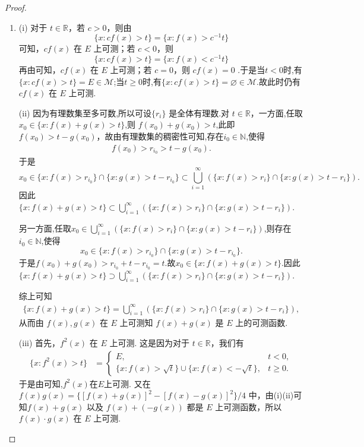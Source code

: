 \documentclass[../../main.tex]{subfiles}%
\begin{document}
\begin{proof}
\begin{enumerate}[(1)]
\item (i) 对于 \(t \in \mathbb{R}\)，若 \(c > 0\)，则由
\[
\{x: cf(x) > t\} = \{x: f(x) > c^{-1}t\}
\]
可知，\(cf(x)\) 在 \(E\) 上可测；若 \(c < 0\)，则
\[
\{x: cf(x) > t\} = \{x: f(x) < c^{-1}t\}
\]
再由可知，\(cf(x)\) 在 \(E\) 上可测；若 \(c = 0\)，则 \(cf(x) = 0\) .于是当$t<0$时,有
$\{x:cf(x)>t\}=E\in \mathscr{M}$;当$t\geqslant 0$时,有$\{x:cf(x)>t\}=\varnothing\in \mathscr{M}$.故此时仍有\(cf(x)\) 在 \(E\) 上可测.

(ii) 因为有理数集至多可数,所以可设\(\{r_i\}\) 是全体有理数.对 \(t \in \mathbb{R}\)，一方面,任取$x_0\in \{x: f(x) + g(x) > t\}$,则 \(f(x_0) + g(x_0) > t\),此即 \(f(x_0) > t - g(x_0)\)，故由有理数集的稠密性可知,存在$i_0\in\mathbb{N}$,使得
\begin{align*}
f(x_0)>r_{i_0}>t-g(x_0).
\end{align*}
于是$$x_0\in \{x:f(x)>r_{i_0}\}\cap \{x: g(x) > t - r_{i_0}\}\subset \bigcup_{i = 1}^{\infty}(\{x: f(x) > r_i\} \cap \{x: g(x) > t - r_i\}).$$因此$\{x: f(x) + g(x) > t\} 
\subset \bigcup_{i = 1}^{\infty}(\{x: f(x) > r_i\} \cap \{x: g(x) > t - r_i\}).$

另一方面,任取$x_0\in  \bigcup_{i = 1}^{\infty}(\{x: f(x) > r_i\} \cap \{x: g(x) > t - r_i\})$,则存在$i_0\in \mathbb{N}$,使得
\[
x_0\in\{x:f(x)>r_{i_0}\}\cap \{x: g(x) > t - r_{i_0}\}.
\]
于是$f(x_0)+g(x_0)>r_{i_0}+t-r_{i_0}=t$.故$x_0\in \{x: f(x) + g(x) > t\} $.因此$\{x: f(x) + g(x) > t\} 
\supset \bigcup_{i = 1}^{\infty}(\{x: f(x) > r_i\} \cap \{x: g(x) > t - r_i\}).$

综上可知
\begin{align*}
\{x: f(x) + g(x) > t\} 
= \bigcup_{i = 1}^{\infty}(\{x: f(x) > r_i\} \cap \{x: g(x) > t - r_i\}),
\end{align*}
从而由 \(f(x),g(x)\) 在 \(E\) 上可测知 \(f(x) + g(x)\) 是 \(E\) 上的可测函数.

(iii) 首先，\(f^2(x)\) 在 \(E\) 上可测. 这是因为对于 \(t \in \mathbb{R}\)，我们有
\begin{align*}
\{x: f^2(x) > t\} 
&= 
\begin{cases}
E, & t < 0,\\
\{x: f(x) > \sqrt{t}\} \cup \{x: f(x) < -\sqrt{t}\}, & t \geqslant 0.
\end{cases}
\end{align*}
于是由可知,$f^2(x)$在$E$上可测.
又在 \(f(x)g(x) = \{[f(x) + g(x)]^2 - [f(x) - g(x)]^2\}/4\) 中，由(i)(ii)可知\(f(x) + g(x)\) 以及 \(f(x) + (-g(x))\) 都是 \(E\) 上可测函数，所以 \(f(x)\cdot g(x)\) 在 \(E\) 上可测.


\end{enumerate}
\end{proof}
\end{document}
